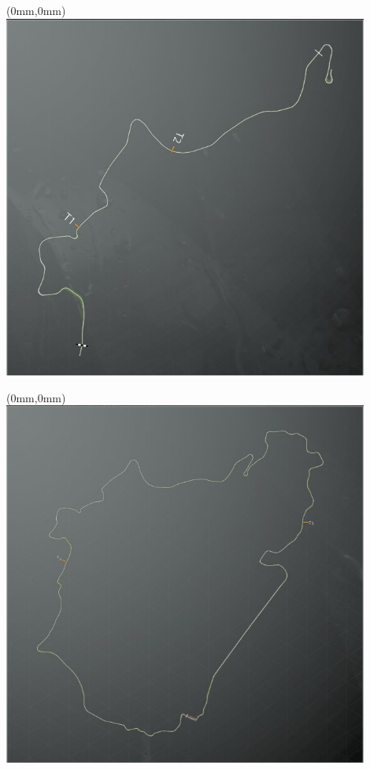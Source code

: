 \null\newpage
\begin{textblock*}{30mm}(0mm,0mm)%
\includegraphics[width=120mm]{TR/2015-05-20_00039.png}
\end{textblock*}
\null\newpage
\begin{textblock*}{30mm}(0mm,0mm)%
\includegraphics[width=120mm]{TR/2015-05-20_00037.png}
\end{textblock*}
